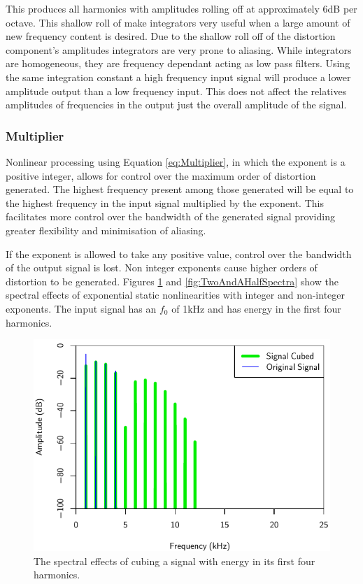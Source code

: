 			This produces all harmonics with amplitudes rolling off at approximately 6dB per octave. This
			shallow roll of make integrators very useful when a large amount of new frequency content is
			desired. Due to the shallow roll off of the distortion component's amplitudes integrators are very
			prone to aliasing. While integrators are homogeneous, they are frequency dependant acting as low
			pass filters. Using the same integration constant a high frequency input signal will produce a
			lower amplitude output than a low frequency input. This does not affect the relatives amplitudes of
			frequencies in the output just the overall amplitude of the signal.

		\subsubsection*{Multiplier}
			Nonlinear processing using Equation \ref{eq:Multiplier}, in which the exponent is a positive
			integer, allows for control over the maximum order of distortion generated. The highest frequency
			present among those generated will be equal to the highest frequency in the input signal multiplied
			by the exponent. This facilitates more control over the bandwidth of the generated signal providing
			greater flexibility and minimisation of aliasing.

			If the exponent is allowed to take any positive value, control over the bandwidth of the output
			signal is lost. Non integer exponents cause higher orders of distortion to be generated. Figures
			\ref{fig:CubedSpectra} and \ref{fig:TwoAndAHalfSpectra} show the spectral effects of exponential
			static nonlinearities with integer and non-integer exponents. The input signal has an $f_{0}$ of
			1kHz and has energy in the first four harmonics.

			\begin{figure}[h!]
				\centering
				\includegraphics{chapter5/Images/CubedSpectra.pdf}
				\caption{The spectral effects of cubing a signal with energy in its first four harmonics.}
				\label{fig:CubedSpectra}
			\end{figure}

